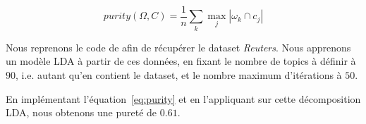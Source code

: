 \documentclass[a4paper]{article}
\renewcommand{\eqref}[1]{équation~\ref{#1}}
\begin{document}
\begin{equation} 
    purity(\Omega, C) = \frac{1}{n} \sum_{k} \max_{j}|\omega_k \cap c_j|
\label{eq:purity}
\end{equation}

Nous reprenons le code de \cite{reuters} afin de récupérer le dataset
\emph{Reuters}. Nous apprenons un modèle LDA à partir de ces données, en fixant
le nombre de topics à définir à $90$, i.e. autant qu'en contient le dataset, et
le nombre maximum d'itérations à $50$. 

En implémentant l'\eqref{eq:purity} et en l'appliquant sur cette décomposition
LDA, nous obtenons une pureté de $0.61$. \\ 


\newpage
\printbibliography
\end{document}
